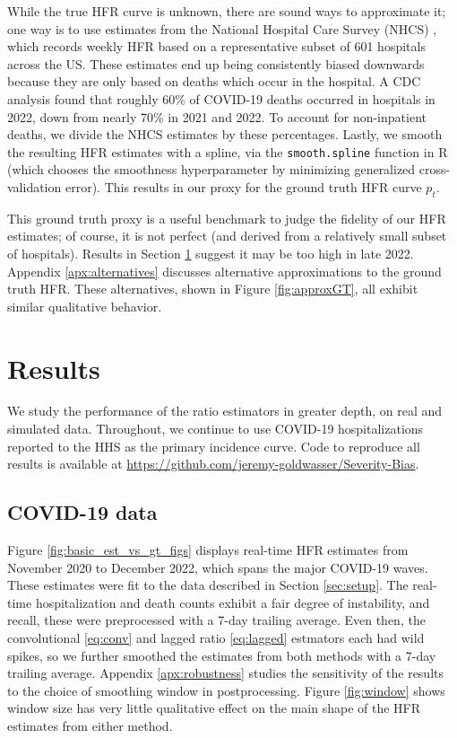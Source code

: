 \documentclass{article}
\begin{document}
While the true HFR curve is unknown, there are sound ways to approximate it; one  
way is to use estimates from the National Hospital Care Survey (NHCS)
\citep{NHCS2023}, which records weekly HFR based on a representative subset 
of 601 hospitals across the US. These estimates end up being consistently
biased downwards because they are only based on deaths which occur in the
hospital. A CDC analysis \citep{ahmad2023covid} found that roughly 60\% of
COVID-19 deaths occurred in hospitals in 2022, down from nearly 70\% in 2021 and
2022. To account for non-inpatient deaths, we divide the NHCS estimates by these
percentages. Lastly, we smooth the resulting HFR estimates with a spline, via
the \texttt{smooth.spline} function in R (which chooses the smoothness
hyperparameter by minimizing generalized cross-validation error). This results 
in our proxy for the ground truth HFR curve $p_t$.  

This ground truth proxy is a useful benchmark to judge the fidelity of our HFR
estimates; of course, it is not perfect (and derived from a relatively small
subset of hospitals). Results in Section \ref{sec:results} suggest it may be too
high in late 2022. 
Appendix \ref{apx:alternatives} discusses alternative
approximations to the ground truth HFR. 
These alternatives, shown in Figure \ref{fig:approxGT}, all exhibit similar qualitative behavior. 

\section{Results}
\label{sec:results}

We study the performance of the ratio estimators in greater depth, on real and 
simulated data. Throughout, we continue to use COVID-19 hospitalizations
reported to the HHS as the primary incidence curve. Code to reproduce all
results is available at
\url{https://github.com/jeremy-goldwasser/Severity-Bias}.            

\subsection{COVID-19 data}
\label{sec:results_real}

Figure \ref{fig:basic_est_vs_gt_figs} displays real-time HFR estimates from
November 2020 to December 2022, which spans the major COVID-19 waves. These
estimates were fit to the data described in Section \ref{sec:setup}. The
real-time hospitalization and death counts exhibit a fair degree of instability,
and recall, these were preprocessed with a 7-day trailing average. Even then,
the convolutional \eqref{eq:conv} and lagged ratio \eqref{eq:lagged} estmators
each had wild spikes, so we further smoothed the estimates from both methods
with a 7-day trailing average. 
Appendix \ref{apx:robustness} studies the
sensitivity of the results to the choice of smoothing window in postprocessing.
Figure    \ref{fig:window} shows window size has very little qualitative effect on the main shape of the HFR estimates from either method. 
\end{document}

